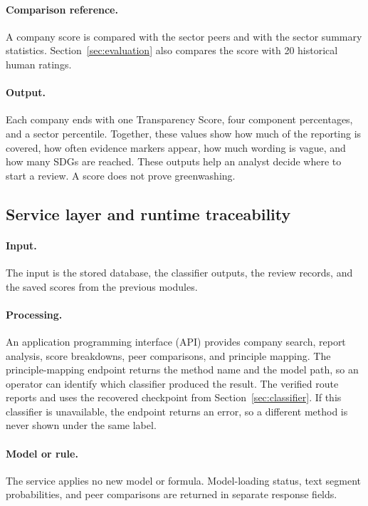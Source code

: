 \paragraph{Comparison reference.} A company score is compared with the sector peers and with the sector summary statistics. Section~\ref{sec:evaluation} also compares the score with 20 historical human ratings.

\paragraph{Output.} Each company ends with one Transparency Score, four component percentages, and a sector percentile. Together, these values show how much of the reporting is covered, how often evidence markers appear, how much wording is vague, and how many SDGs are reached. These outputs help an analyst decide where to start a review. A score does not prove greenwashing.

\subsection{Service layer and runtime traceability}
\label{sec:api}

\paragraph{Input.} The input is the stored database, the classifier outputs, the review records, and the saved scores from the previous modules.

\paragraph{Processing.} An application programming interface (API) provides company search, report analysis, score breakdowns, peer comparisons, and principle mapping. The principle-mapping endpoint returns the method name and the model path, so an operator can identify which classifier produced the result. The verified route reports  and uses the recovered checkpoint from Section~\ref{sec:classifier}. If this classifier is unavailable, the endpoint returns an error, so a different method is never shown under the same label.

\paragraph{Model or rule.} The service applies no new model or formula. Model-loading status, text segment probabilities, and peer comparisons are returned in separate response fields.


